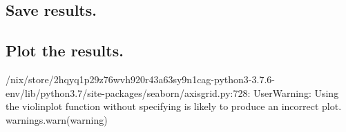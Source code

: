 \documentclass[letterpaper,10pt,english]{sphinxmanual}
\begin{document}
\subsection{Save results.}
\label{\detokenize{doc-src/ioc-1:save-results-1}}
\begin{sphinxVerbatim}[commandchars=\\\{\}]
\end{sphinxVerbatim}

\begin{sphinxVerbatim}[commandchars=\\\{\}]
\end{sphinxVerbatim}


\subsection{Plot the results.}
\label{\detokenize{doc-src/ioc-1:plot-the-results-1}}
\begin{sphinxVerbatim}[commandchars=\\\{\}]
\end{sphinxVerbatim}



\begin{sphinxVerbatim}[commandchars=\\\{\}]
  
      
      
      
      
\end{sphinxVerbatim}
\begin{sphinxalltt}
/nix/store/2hqyq1p29z76wvh920r43a63sy9n1cag-python3-3.7.6-env/lib/python3.7/site-packages/seaborn/axisgrid.py:728: UserWarning: Using the violinplot function without specifying  is likely to produce an incorrect plot.
  warnings.warn(warning)
\end{sphinxalltt}
\end{document}

